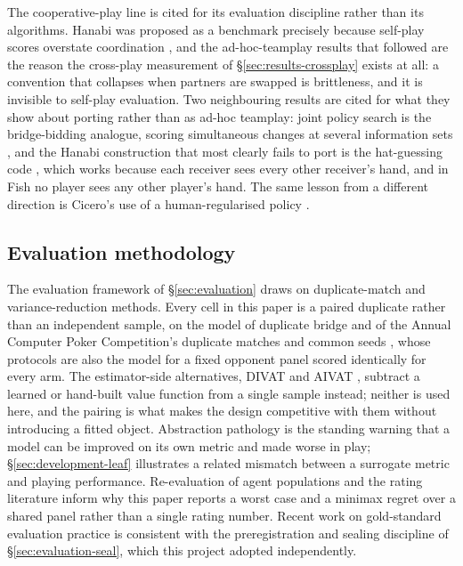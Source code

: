 The cooperative-play line is cited for its evaluation discipline rather than its algorithms. Hanabi
was proposed as a benchmark precisely because self-play scores overstate coordination
\cite{bard-hanabi}, and the ad-hoc-teamplay results that followed
\cite{hu-sad,hu-otherplay,hu2021obl,hu2022sed,jacob2022pikl,hu2022humanregularized,dizdarevic2025ah2ac2}
are the reason the cross-play measurement of \S\ref{sec:results-crossplay} exists at all: a
convention that collapses when partners are swapped is brittleness, and it is invisible to self-play
evaluation. Two neighbouring results are cited for what they show about porting rather than as
ad-hoc teamplay: joint policy search is the bridge-bidding analogue, scoring simultaneous changes at
several information sets \cite{tian2020jps}, and the Hanabi construction that most clearly fails to
port is the hat-guessing code \cite{cox-hanabi}, which works because each receiver sees every other
receiver's hand, and in Fish no player sees any other player's hand. The same lesson from a different direction is Cicero's use of a human-regularised policy
\cite{fair2022cicero}.

\subsection{Evaluation methodology}
\label{sec:related-eval}

The evaluation framework of \S\ref{sec:evaluation} draws on duplicate-match and
variance-reduction methods. Every cell in this paper is a paired duplicate rather than an
independent sample, on the model of duplicate bridge and of the Annual Computer Poker Competition's
duplicate matches and common seeds \cite{acpc}, whose protocols are also the model for a fixed
opponent panel scored identically for every arm. The estimator-side alternatives, DIVAT \cite{zinkevich-divat} and AIVAT
\cite{burch-aivat}, subtract a learned or hand-built value function from a single sample instead;
neither is used here, and the pairing is what makes the design competitive with them without
introducing a fitted object. Abstraction pathology
\cite{waugh-abstraction} is the standing warning that a model can be improved on its own metric and
made worse in play; \S\ref{sec:development-leaf} illustrates a related mismatch between a surrogate
metric and playing performance. Re-evaluation of agent
populations \cite{balduzzi-reeval} and the rating literature
\cite{coulom-whr,herbrich-trueskill,nelo,nelo-fishtest} inform why this paper reports a worst case and a minimax
regret over a shared panel rather than a single rating number. Recent work on gold-standard
evaluation practice \cite{kelidari2026goldstandard} is consistent with the preregistration and
sealing discipline of \S\ref{sec:evaluation-seal}, which this project adopted independently.
